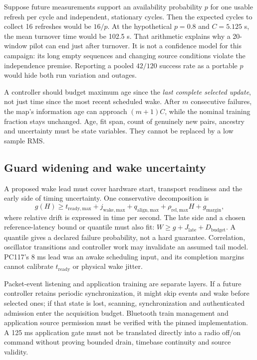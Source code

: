 \documentclass[11pt,letterpaper]{article}
\begin{document}
Suppose future measurements support an availability probability $p$ for one usable refresh per cycle and independent, stationary cycles. Then the expected cycles to collect 16 refreshes would be $16/p$. At the hypothetical $p=0.8$ and $C=5.125$ s, the mean turnover time would be 102.5 s. That arithmetic explains why a 20-window pilot can end just after turnover. It is not a confidence model for this campaign: its long empty sequences and changing source conditions violate the independence premise. Reporting a pooled $42/120$ success rate as a portable $p$ would hide both run variation and outages.

A controller should budget maximum age since the \emph{last complete selected update}, not just time since the most recent scheduled wake. After $m$ consecutive failures, the map's information age can approach $(m+1)C$, while the nominal training fraction stays unchanged. Age, fit span, count of genuinely new pairs, ancestry and uncertainty must be state variables. They cannot be replaced by a low sample RMS.

\subsection{Guard widening and wake uncertainty}
A proposed wake lead must cover hardware start, transport readiness and the early side of timing uncertainty. One conservative decomposition is
\begin{equation}
 g(H)\ge t_{\mathrm{ready,max}}+j_{\mathrm{wake,max}}+
 q_{\mathrm{align,max}}+\rho_{\mathrm{rel,max}}H+g_{\mathrm{margin}},\label{eq:guard}
\end{equation}
where relative drift is expressed in time per second. The late side and a chosen reference-latency bound or quantile must also fit: $W\ge g+J_{\mathrm{late}}+D_{\mathrm{budget}}$. A quantile gives a declared failure probability, not a hard guarantee. Correlation, oscillator transitions and controller work may invalidate an assumed tail model. PC117's 8 ms lead was an awake scheduling input, and its completion margins cannot calibrate $t_{\mathrm{ready}}$ or physical wake jitter.

Packet-event listening and application training are separate layers. If a future controller retains periodic synchronization, it might skip events and wake before selected ones; if that state is lost, scanning, synchronization and authenticated admission enter the acquisition budget. Bluetooth train management and application source permission must be verified with the pinned implementation. A 125 ms application gate must not be translated directly into a radio off/on command without proving bounded drain, timebase continuity and source validity.
\end{document}
